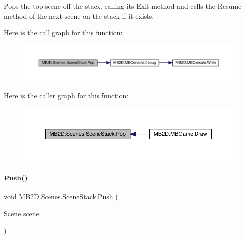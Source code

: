 Pops the top scene off the stack, calling its Exit method and calls the Resume method of the next scene on the stack if it exists. 

Here is the call graph for this function\+:
\nopagebreak
\begin{figure}[H]
\begin{center}
\leavevmode
\includegraphics[width=350pt]{class_m_b2_d_1_1_scenes_1_1_scene_stack_a134c3aff1731fb86116b78cac7112464_cgraph}
\end{center}
\end{figure}
Here is the caller graph for this function\+:
\nopagebreak
\begin{figure}[H]
\begin{center}
\leavevmode
\includegraphics[width=350pt]{class_m_b2_d_1_1_scenes_1_1_scene_stack_a134c3aff1731fb86116b78cac7112464_icgraph}
\end{center}
\end{figure}
\hypertarget{class_m_b2_d_1_1_scenes_1_1_scene_stack_a22760622453ac16621534bc324ec039f}{}\label{class_m_b2_d_1_1_scenes_1_1_scene_stack_a22760622453ac16621534bc324ec039f} 
\paragraph{\texorpdfstring{Push()}{Push()}}
{\footnotesize\ttfamily void M\+B2\+D.\+Scenes.\+Scene\+Stack.\+Push (\begin{DoxyParamCaption}\item[{\hyperlink{class_m_b2_d_1_1_scenes_1_1_scene}{Scene}}]{scene }\end{DoxyParamCaption})\hspace{0.3cm}{\ttfamily [inline]}}



